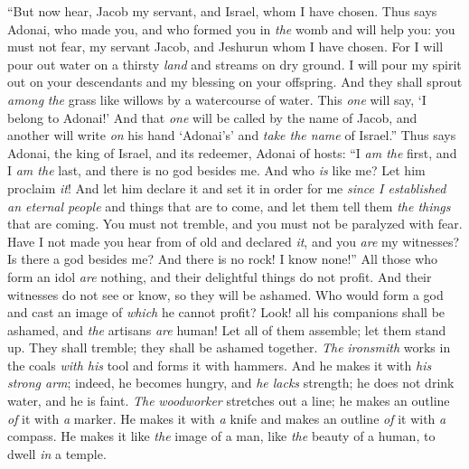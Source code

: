 \begin{biblechapter} %
 “But now hear, Jacob my servant, 
and Israel, whom I have chosen.
\verse Thus says Adonai, who made you, 
and who formed you in \textit{the} womb and will help you: 
you must not fear, my servant Jacob, 
and Jeshurun whom I have chosen.
\verse For I will pour out water on a thirsty \textit{land} 
and streams on dry ground. 
I will pour my spirit out on your descendants 
and my blessing on your offspring.
\verse And they shall sprout \textit{among} \textit{the} grass 
like willows by a watercourse of water.
\verse This \textit{one} will say, ‘I belong to Adonai!’ 
And that \textit{one} will be called by the name of Jacob, 
and another will write \textit{on} his hand ‘Adonai’s’ 
and \textit{take the name} of Israel.”
 Thus says Adonai, the king of Israel, 
and its redeemer, Adonai of hosts: 
“I \textit{am the} first, and I \textit{am the} last, 
and there is no god besides me.
\verse And who \textit{is} like me? Let him proclaim \textit{it}! 
And let him declare it and set it in order for me 
\textit{since I established an eternal people} and things that are to come, 
and let them tell them \textit{the things} that are coming.
\verse You must not tremble, 
and you must not be paralyzed with fear. 
Have I not made you hear from of old 
and declared \textit{it}, and you \textit{are} my witnesses? 
Is there a god besides me? 
And there is no rock! I know none!”
 All those who form an idol \textit{are} nothing, 
and their delightful things do not profit. 
And their witnesses do not see or know, 
so they will be ashamed.
\verse Who would form a god 
and cast an image of \textit{which} he cannot profit?
\verse Look! all his companions shall be ashamed, 
and \textit{the} artisans \textit{are} human! 
Let all of them assemble; 
let them stand up. 
They shall tremble; 
they shall be ashamed together.
\verse \textit{The} \textit{ironsmith} works in the coals \textit{with his} tool 
and forms it with hammers. 
And he makes it with \textit{his strong arm}; 
indeed, he becomes hungry, and \textit{he lacks} strength; 
he does not drink water, and he is faint.
\verse \textit{The} \textit{woodworker} stretches out a line; 
he makes an outline \textit{of} it with \textit{a} marker. 
He makes it with \textit{a} knife 
and makes an outline \textit{of} it with \textit{a} compass. 
He makes it like \textit{the} image of a man, 
like \textit{the} beauty of a human, to dwell \textit{in} a temple.

\end{biblechapter}
